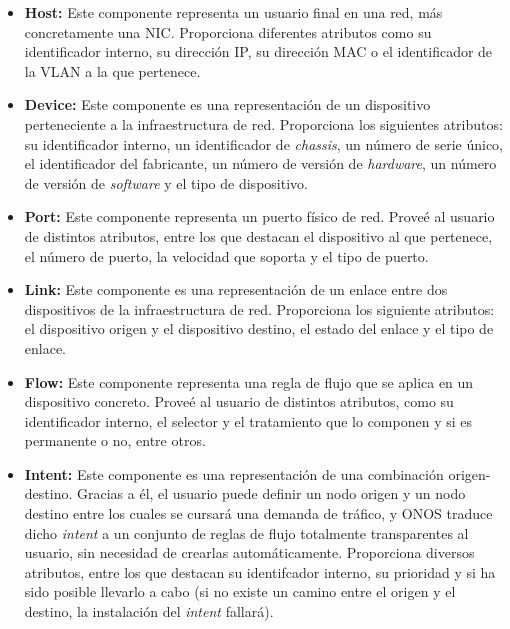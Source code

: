 \begin{itemize}
	
	\item \textbf{Host:} Este componente representa un usuario final en una red, más concretamente una \ac{NIC}. Proporciona diferentes atributos como su identificador interno, su dirección \ac{IP}, su dirección \ac{MAC} o el identificador de la \ac{VLAN} a la que pertenece.
	
	\item \textbf{Device:} Este componente es una representación de un dispositivo perteneciente a la infraestructura de red. Proporciona los siguientes atributos: su identificador interno, un identificador de \textit{chassis}, un número de serie único, el identificador del fabricante, un número de versión de \textit{hardware}, un número de versión de \textit{software} y el tipo de dispositivo. 
	
	\item \textbf{Port:} Este componente representa un puerto físico de red. Proveé al usuario de distintos atributos, entre los que destacan el dispositivo al que pertenece, el número de puerto, la velocidad que soporta y el tipo de puerto.
	
	\item \textbf{Link:} Este componente es una representación de un enlace entre dos dispositivos de la infraestructura de red. Proporciona los siguiente atributos: el dispositivo origen y el dispositivo destino, el estado del enlace y el tipo de enlace.
	
	\item \textbf{Flow:} Este componente representa una regla de flujo que se aplica en un dispositivo concreto. Proveé al usuario de distintos atributos, como su identificador interno, el selector y el tratamiento que lo componen y si es permanente o no, entre otros.
	
	\item \textbf{Intent:} Este componente es una representación de una combinación origen-destino. Gracias a él, el usuario puede definir un nodo origen y un nodo destino entre los cuales se cursará una demanda de tráfico, y \ac{ONOS} traduce dicho \textit{intent} a un conjunto de reglas de flujo totalmente transparentes al usuario, sin necesidad de crearlas automáticamente. Proporciona diversos atributos, entre los que destacan su identifcador interno, su prioridad y si ha sido posible llevarlo a cabo (si no existe un camino entre el origen y el destino, la instalación del \textit{intent} fallará).
	
\end{itemize}


